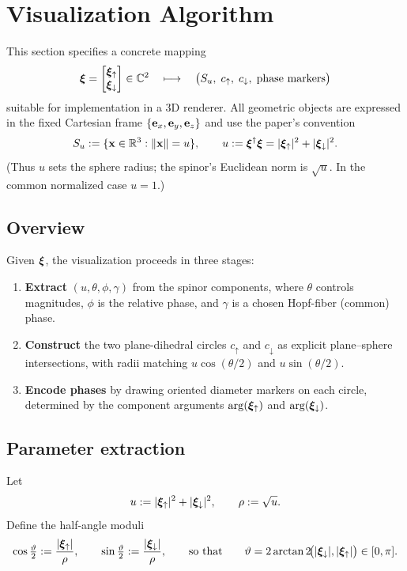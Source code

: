 \section{\label{sec:algorithm} Visualization Algorithm}

This section specifies a concrete mapping
\[
\bm{\xi}=\begin{bmatrix}\bm{\xi}_\uparrow\\ \bm{\xi}_\downarrow\end{bmatrix}\in\mathbb{C}^2
\quad\longmapsto\quad
\bigl(S_u,\;c_\uparrow,\;c_\downarrow,\;\text{phase markers}\bigr)
\]
suitable for implementation in a 3D renderer.
All geometric objects are expressed in the fixed Cartesian frame
$\{\mathbf{e}_{x},\mathbf{e}_{y},\mathbf{e}_{z}\}$ and use the paper's convention
\[
S_u:=\{\mathbf{x}\in\mathbb{R}^3:\lVert\mathbf{x}\rVert=u\},\qquad u:=\bm{\xi}^\dagger\bm{\xi}=|\bm{\xi}_\uparrow|^2+|\bm{\xi}_\downarrow|^2.
\]
(Thus $u$ sets the sphere radius; the spinor's Euclidean norm is $\sqrt{u}$. In the common normalized case $u=1$.)

\subsection{Overview}
Given $\bm{\xi}$, the visualization proceeds in three stages:
\begin{enumerate}
  \item \textbf{Extract} $(u,\theta,\phi,\gamma)$ from the spinor components, where $\theta$ controls magnitudes, $\phi$ is the relative phase, and $\gamma$ is a chosen Hopf-fiber (common) phase.
  \item \textbf{Construct} the two plane-dihedral circles $c_\uparrow$ and $c_\downarrow$ as explicit plane--sphere intersections,
        with radii matching $u\cos(\theta/2)$ and $u\sin(\theta/2)$.
  \item \textbf{Encode phases} by drawing oriented diameter markers on each circle, determined by the component arguments $\arg(\bm{\xi}_\uparrow)$ and $\arg(\bm{\xi}_\downarrow)$.
\end{enumerate}

\subsection{Parameter extraction}
Let
\begin{equation}
u:=|\bm{\xi}_\uparrow|^2+|\bm{\xi}_\downarrow|^2,\qquad \rho:=\sqrt{u}.
\end{equation}
Define the half-angle moduli
\begin{equation}
\cos\tfrac{\vartheta}{2} := \frac{|\bm{\xi}_\uparrow|}{\rho},\qquad \sin\tfrac{\vartheta}{2} := \frac{|\bm{\xi}_\downarrow|}{\rho},
\qquad\text{so that}\qquad
\vartheta = 2\arctan2\!\bigl(|\bm{\xi}_\downarrow|,|\bm{\xi}_\uparrow|\bigr)\in[0,\pi].
\end{equation}

